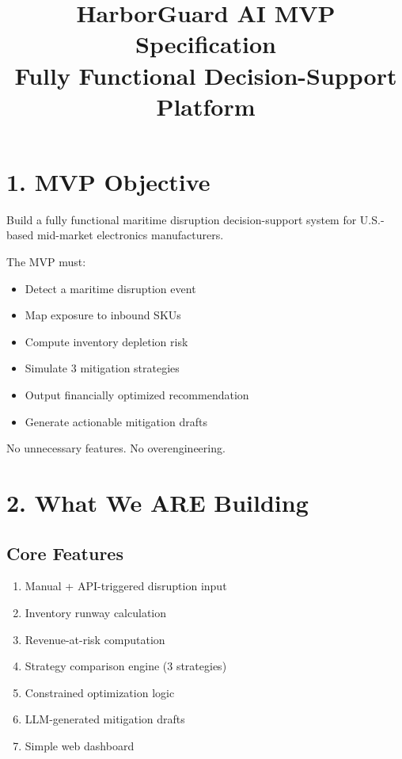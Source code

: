 \documentclass[11pt]{article}
\title{\textbf{HarborGuard AI MVP Specification}\\
Fully Functional Decision-Support Platform}
\date{}
\begin{document}
\maketitle

\section*{1. MVP Objective}

Build a fully functional maritime disruption decision-support system for U.S.-based mid-market electronics manufacturers.

The MVP must:

\begin{itemize}
    \item Detect a maritime disruption event
    \item Map exposure to inbound SKUs
    \item Compute inventory depletion risk
    \item Simulate 3 mitigation strategies
    \item Output financially optimized recommendation
    \item Generate actionable mitigation drafts
\end{itemize}

No unnecessary features. No overengineering.

\section*{2. What We ARE Building}

\subsection*{Core Features}

\begin{enumerate}
    \item Manual + API-triggered disruption input
    \item Inventory runway calculation
    \item Revenue-at-risk computation
    \item Strategy comparison engine (3 strategies)
    \item Constrained optimization logic
    \item LLM-generated mitigation drafts
    \item Simple web dashboard
\end{enumerate}
\end{document}
